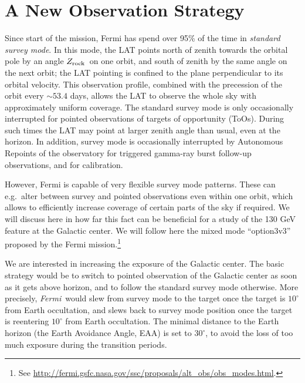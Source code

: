 \documentclass[aps,prd,superscriptaddress,showpacs,nofootinbib,fixlfloat, 12pt]{revtex4-1}
\newcommand{\Fermi}{{\slshape Fermi}}
\newcommand{\degree}{^{\rm o}}
\newcommand{\zrock}{$Z_{\rm rock}$}
\begin{document}
\section{A New Observation Strategy}
Since start of the mission, Fermi has spend over 95\% of the time in
\emph{standard survey mode}.
In this mode, the LAT points north of zenith towards the orbital pole by an
angle \zrock\ on one orbit, and south of zenith by the same angle on the next
orbit; the LAT pointing is confined to the plane perpendicular to its orbital
velocity. 
This observation profile, combined with the precession of the orbit every
$\sim53.4$ days, allows the LAT to observe the whole sky with approximately
uniform coverage. The standard survey mode is only occasionally interrupted
for pointed observations of targets of opportunity (ToOs). During such times
the LAT may point at larger zenith angle than usual, even at the horizon.  In
addition, survey mode is occasionally interrupted by Autonomous Repoints of
the observatory for triggered gamma-ray burst follow-up observations, and for
calibration.

However, Fermi is capable of very flexible survey mode patterns. These can
e.g.~alter between survey and pointed observations even within one orbit,
which allows to efficiently increase coverage of certain parts of the sky if
required. We will discuss here in how far this fact can be beneficial for a
study of the 130 GeV feature at the Galactic center. We will
follow here the mixed mode ``option3v3'' proposed by the Fermi
mission.\footnote{See
\url{http://fermi.gsfc.nasa.gov/ssc/proposals/alt_obs/obs_modes.html}.}

We are interested in increasing the exposure of the Galactic center. The basic
strategy would be to switch to pointed observation of the Galactic center as
soon as it gets above horizon, and to follow the standard survey mode
otherwise. More precisely, \Fermi\ would slew from survey mode to the target
once the target is $10^\circ$ from Earth occultation, and slews back to survey
mode position once the target is reentering $10^\circ$ from Earth occultation.
The minimal distance to the Earth horizon (the Earth Avoidance Angle, EAA) is
set to $30^\circ$, to avoid the loss of too much exposure during the
transition periods. 
\end{document}
